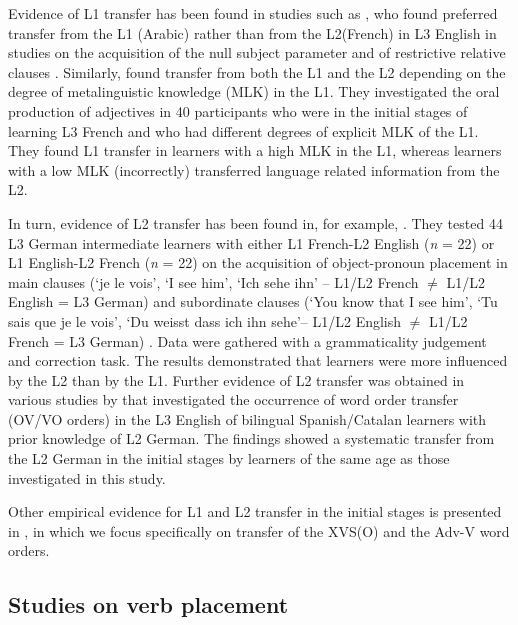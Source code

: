 \documentclass[output=paper]{langsci/langscibook}
\begin{document}
Evidence of L1 transfer has been found in studies such as \citep{Hermas2014Morphosyntax, Hermas2014Relatives}, who found preferred transfer from the L1 (Arabic) rather than from the L2\linebreak (French) in L3 English in studies on the acquisition of the null subject parameter \citep{Hermas2014Morphosyntax} and of restrictive relative clauses \citep{Hermas2014Relatives}. Similarly, \citet{FalkEtAl2015} found transfer from both the L1 and the L2 depending on the degree of metalinguistic knowledge (MLK) in the L1. They investigated the oral production of adjectives in 40 participants who were in the initial stages of learning L3 French and who had different degrees of explicit MLK of the L1. They found L1 transfer in learners with a high MLK in the L1, whereas learners with a low MLK (incorrectly) transferred language related information from the L2.

In turn, evidence of L2 transfer has been found in, for example, \citet{FalkBardel2011}. They tested 44 L3 German intermediate learners with either L1 French-L2 English (\textit{n} = 22) or L1 English-L2 French (\textit{n} = 22) on the acquisition of object-pronoun placement in main clauses (‘je {le} vois’, ‘I see {him}’, ‘Ich sehe {ihn’} – L1/L2 French ${\neq}$ L1/L2 English = L3 German) and subordinate clauses (‘You know that I see {him}’, ‘Tu sais que je {le} vois’, ‘Du weisst dass ich {ihn} sehe’– L1/L2 English ${\neq}$ L1/L2 French = L3 German) \citep[60]{FalkBardel2011}. Data were gathered with a grammaticality judgement and correction task. The results demonstrated that learners were more influenced by the L2 than by the L1. Further evidence of L2 transfer was obtained in various studies by \citet{Sánchez2012, Sánchez2015, Sánchez2016} that investigated the occurrence of word order transfer (OV/VO orders) in the L3 English of bilingual Spanish/Catalan learners with prior knowledge of L2 German. The findings showed a systematic transfer from the L2 German in the initial stages by learners of the same age as those investigated in this study.

Other empirical evidence for L1 and L2 transfer in the initial stages is presented in , in which we focus specifically on transfer of the XVS(O) and the Adv-V word orders.

\subsection{{Studies on verb} {placement} }%
\label{sec:stadt:2.2}
\end{document}
